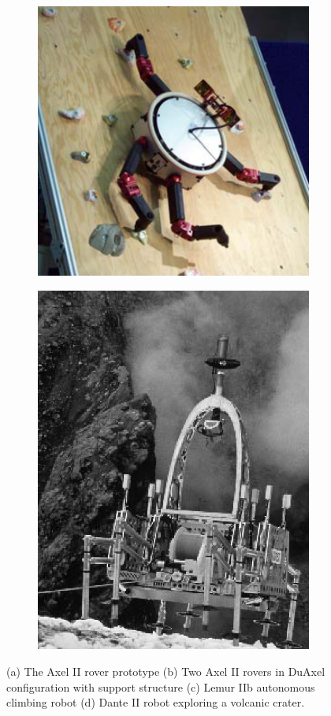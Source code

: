 \documentclass[12pt]{article}
\begin{document}
\begin{figure}
\begin{subfigure}{.245\textwidth}
    \includegraphics[width=.88\linewidth]{lemur_prototype}
    \caption{}
    \label{fig:lemur}
  \end{subfigure}%
  \begin{subfigure}{.245\textwidth}
    \centering
    \includegraphics[width=.65\linewidth]{dante_prototype}
    \caption{}
    \label{fig:dante}
  \end{subfigure}  %
  \label{fig:prototypes}
  \vspace{-0.1in}
  \caption{(a) The Axel II rover prototype (b) Two Axel II rovers in DuAxel configuration 
  with support structure (c) Lemur IIb autonomous climbing robot (d) Dante II robot exploring a 
  volcanic crater. }
\end{figure}
\end{document}
